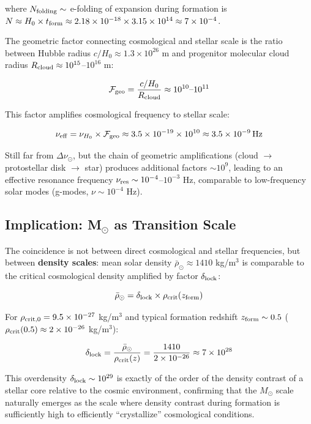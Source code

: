 \documentclass[10pt,a4paper]{article}
\begin{document}
where \(N_{\rm folding} \sim\) e-folding of expansion during formation
is
\(N \approx H_0 \times t_{\rm form} \approx 2.18\times10^{-18} \times 3.15\times10^{14} \approx 7\times10^{-4}\).

The geometric factor connecting cosmological and stellar scale is the
ratio between Hubble radius \(c/H_0 \approx 1.3\times10^{26}\) m and
progenitor molecular cloud radius
\(R_{\rm cloud} \approx 10^{15}\)--\(10^{16}\) m:

\[\mathcal{F}_{\rm geo} = \frac{c/H_0}{R_{\rm cloud}} \approx 10^{10}\text{--}10^{11}\]

This factor amplifies cosmological frequency to stellar scale:

\[\nu_{\rm eff} = \nu_{H_0} \times \mathcal{F}_{\rm geo} \approx 3.5\times10^{-19} \times 10^{10} \approx 3.5\times10^{-9}\,\mathrm{Hz}\]

Still far from \(\Delta\nu_\odot\), but the chain of geometric
amplifications (cloud $\rightarrow$ protostellar disk $\rightarrow$ star) produces additional
factors \(\sim 10^9\), leading to an effective resonance frequency
\(\nu_{\rm res} \sim 10^{-4}\)--\(10^{-3}\) Hz, comparable to
low-frequency solar modes (g-modes, \(\nu \sim 10^{-4}\) Hz).

\subsection*{Implication: M$_{\odot}$ as Transition
Scale}\label{b.3-implication-m-as-transition-scale}

The coincidence is not between direct cosmological and stellar
frequencies, but between \textbf{density scales}: mean solar density
\(\bar\rho_\odot \approx 1410\) kg/m$^{3}$ is comparable to the critical
cosmological density amplified by factor \(\delta_{\rm lock}\):

\[\bar\rho_\odot = \delta_{\rm lock} \times \rho_{\rm crit}(z_{\rm form})\]

For \(\rho_{\rm crit,0} = 9.5\times10^{-27}\) kg/m$^{3}$ and typical
formation redshift \(z_{\rm form} \sim 0.5\)
(\(\rho_{\rm crit}(0.5) \approx 2\times10^{-26}\) kg/m$^{3}$):

\[\delta_{\rm lock} = \frac{\bar\rho_\odot}{\rho_{\rm crit}(z)} = \frac{1410}{2\times10^{-26}} \approx 7\times10^{28}\]

This overdensity \(\delta_{\rm lock} \sim 10^{29}\) is exactly of the
order of the density contrast of a stellar core relative to the cosmic
environment, confirming that the \(M_\odot\) scale naturally emerges as
the scale where density contrast during formation is sufficiently high
to efficiently ``crystallize'' cosmological conditions.
\end{document}
